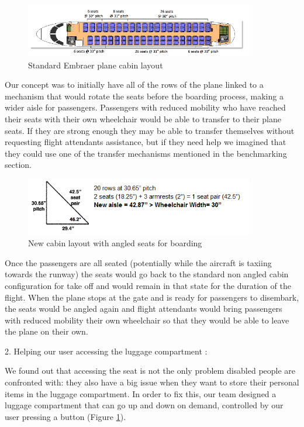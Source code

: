 \begin{figure}[h]
  \centering
     \includegraphics[width=10cm]{images/embraer_plane.png}
   \caption{Standard Embraer plane cabin layout}
  \label{fig:embraer_plane}
\end{figure}

Our concept was to initially have all of the rows of the plane linked to a mechanism that would rotate the seats before the boarding process, making a wider aisle for passengers. Passengers with reduced mobility who have reached their seats with their own wheelchair would be able to transfer to their plane seats. If they are strong enough they may be able to transfer themselves without requesting flight attendants assistance, but if they need help we imagined that they could use one of the transfer mechanisms mentioned in the benchmarking section.
\begin{figure}[h]
  \centering
     \includegraphics[width=10cm]{images/angled_seats.png}
   \caption{New cabin layout with angled seats for boarding}
  \label{fig:angled_seats}
\end{figure}

Once the passengers are all seated (potentially while the aircraft is taxiing towards the runway) the seats would go back to the standard non angled cabin configuration for take off and would remain in that state for the duration of the flight. When the plane stops at the gate and is ready for passengers to disembark, the seats would be angled again and flight attendants would bring passengers with reduced mobility their own wheelchair so that they would be able to leave the plane on their own. 

2. Helping our user accessing the luggage compartment :

We found out that accessing the seat is not the only problem disabled people are confronted with: they also have a big issue when they want to store their personal items in the luggage compartment. In order to fix this, our team designed a luggage compartment that can go up and down on demand, controlled by our user pressing a button (Figure \ref{fig:embraer_plane}).

